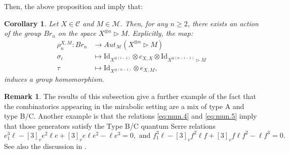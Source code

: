 \documentclass{amsart}
\numberwithin{equation}{section}
\theoremstyle{theorem}
\newtheorem{corollary}[theorem]{Corollary}
\theoremstyle{definition}
\newtheorem{remark}[theorem]{Remark}
\newcommand{\cc}{\mathcal{C}}
\newcommand{\mm}{\mathcal{M}}
\begin{document}
Then, the above proposition and \cite[Proposition 3.4]{MW26} imply that:

\begin{corollary}
Let $X\in\cc$ and $M\in \mm$. Then, for any $n\geq 2$, there exists an action of the group $Br_n$ on the space $X^{\otimes n} \rhd M$. Explicitly, the map:
\begin{align*}
\rho_n^{X,M}:Br_n&\to Aut_{\mm}(X^{\otimes n} \rhd M)\\
\sigma_i&\mapsto \mathrm{Id}_{X^{\otimes (i-1)}}\otimes c_{X,X}\otimes \mathrm{Id}_{X^{\otimes(n-i-1)}\rhd M}\\
\tau&\mapsto \mathrm{Id}_{X^{\otimes (n-1)}}\otimes e_{X,M},
\end{align*}
induces a group homomorphism.
\end{corollary}

\begin{remark}
The results of this subsection give a further example of the fact that the combinatorics appearing in the mirabolic setting are a mix of type A and type B/C. Another example is that the relations \eqref{eq:mun.4} and \eqref{eq:mun.5} imply that those generators satisfy the Type B/C quantum Serre relations
\[e_1^3\ell-[3]_ve^2\ell e + [3]_v e\ell e^2- \ell e^3 = 0, \text{ and } f_1^3\ell- [3]_vf^2\ell f + [3]_vf\ell f^2 -\ell f^3 = 0.\]
See also the discussion in \cite[Rem 3.7]{R15}.
\end{remark}






 
\end{document}
